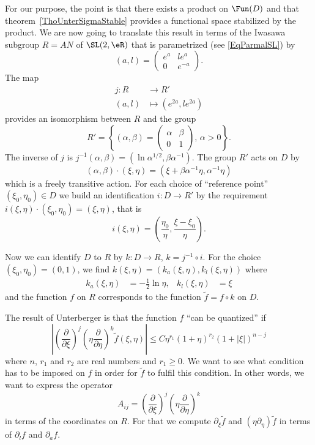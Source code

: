 For our purpose, the point is that there exists a product on $\Fun(D)$ and that theorem~\ref{ThoUnterSigmaStable} provides a functional space stabilized by the product. We are now going to translate this result in terms of the Iwasawa subgroup $R=AN$ of $\SL(2,\eR)$ that is parametrized (see \eqref{EqParmalSL}) by
\[
  (a,l)=\begin{pmatrix}
 e^{a}&l e^{a}\\0& e^{-a}
\end{pmatrix}.
\]
 The map
\begin{equation}
\begin{aligned}
 j\colon R&\to R' \\
(a,l)&\mapsto ( e^{2a},l e^{2a})
\end{aligned}
\end{equation}
provides an isomorphism between $R$ and the group
\[
  R'=\left\{ (\alpha,\beta)= \begin{pmatrix}
\alpha&\beta\\0&1
\end{pmatrix},\,\alpha>0 \right\}.
\]
The inverse of $j$ is  $j^{-1}(\alpha,\beta)=(\ln\alpha^{1/2},\beta\alpha^{-1})$.  The group $R'$ acts on $D$ by
\begin{equation}
(\alpha,\beta)\cdot(\xi,\eta)=(\xi+\beta\alpha^{-1}\eta,\alpha^{-1}\eta)
\end{equation}
which is a freely transitive action. For each choice of ``reference point'' $(\xi_0,\eta_0)\in D$ we  build an identification $i\colon D\to R'$ by the requirement $ i(\xi,\eta)\cdot(\xi_0,\eta_0)=(\xi,\eta)$, that is
\begin{equation}
i(\xi,\eta)=\left( \frac{ \eta_0 }{ \eta },\frac{ \xi-\xi_0 }{ \eta } \right).
\end{equation}

Now we can identify $D$ to $R$ by $k\colon D\to R$, $k=j^{-1}\circ i$. For the choice $(\xi_0,\eta_0)=(0,1)$, we find $k(\xi,\eta)=(k_a(\xi,\eta),k_l(\xi,\eta))$ where
\begin{align}\label{Eqkaklexp}
	k_a(\xi,\eta)&=-\frac{ 1 }{2}\ln\eta,
  &k_l(\xi,\eta)&=\xi
\end{align}
and the function $f$ on $R$ corresponds to the function $\tilde f=f\circ k$ on $D$.

The result of Unterberger is that the function $f$ ``can be quantized'' if
\begin{equation}  \label{eq_condeUnterD}
\left|  \left( \frac{ \partial }{ \partial\xi } \right)^j\left( \eta\frac{ \partial }{ \partial\eta } \right)^k  \tilde f(\xi,\eta)  \right|
\leq C\eta^{r_1}(1+\eta)^{r_2}(1+| \xi |)^{n-j}
\end{equation}
where $n$, $r_1$ and $r_2$ are real numbers and $r_1\geq0$. We want to see what condition has to be imposed on $f$  in order for $\tilde f$ to fulfil this condition. In other words, we want to express the operator
\[
  A_{ij}=\left( \frac{ \partial }{ \partial\xi } \right)^j\left( \eta\frac{ \partial }{ \partial\eta } \right)^k
\]
in terms of the coordinates on $R$. For that we compute $\partial_{\xi}\tilde f$ and $(\eta\partial_{\eta})\tilde f$ in terms of $\partial_lf$ and $\partial_af$.


